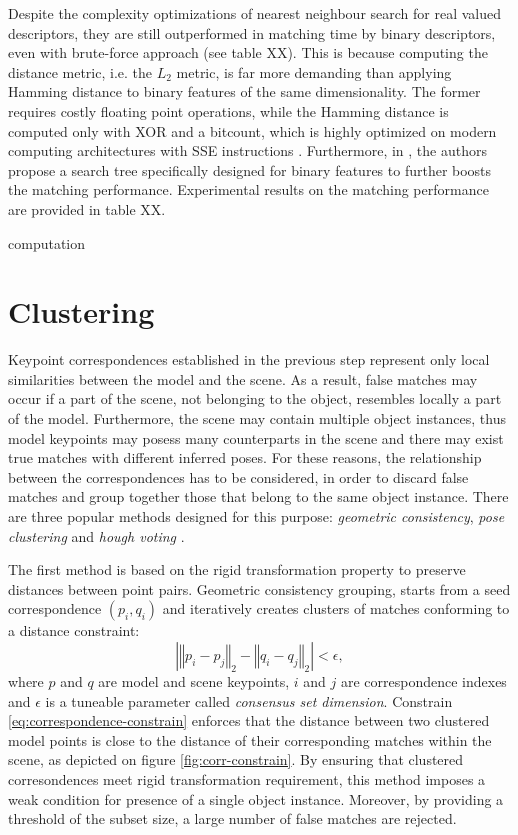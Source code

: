 Despite the complexity optimizations of nearest neighbour search for real valued descriptors, they are still outperformed in matching time by binary descriptors, even with brute-force approach (see table XX). This is because computing the distance metric, i.e. the $L_2$ metric, is far more demanding than applying Hamming distance to binary features of the same dimensionality. The former requires costly floating point operations, while the Hamming distance is computed only with XOR and a bitcount, which is highly optimized on modern computing architectures with SSE instructions \cite{ORB}. Furthermore, in \cite{binaryFlann}, the authors propose a search tree specifically designed for binary features to further boosts the matching performance. Experimental results on the matching performance are provided in table XX.

computation


\section{Clustering}
\label{sec:clustering}

Keypoint correspondences established in the previous step represent only local similarities between the model and the scene. As a result, false matches may occur if a part of the scene, not belonging to the object, resembles locally a part of the model. Furthermore, the scene may contain multiple object instances, thus model keypoints may posess many counterparts in the scene and there may exist true matches with different inferred poses. For these reasons, the relationship between the correspondences has to be considered, in order to discard false matches and group together those that belong to the same object instance. There are three popular methods designed for this purpose: \textit{geometric consistency}, \textit{pose clustering} and \textit{hough voting} \cite{hough}.

The first method is based on the rigid transformation property to preserve distances between point pairs. Geometric consistency \cite{geometricConsistency,multiPipeline} grouping, starts from a seed correspondence $(p_i, q_i)$ and iteratively creates clusters of matches conforming to a distance constraint:
\begin{equation}
\left|\left\Vert p_i - p_j \right\Vert_2 - \left\Vert q_i - q_j \right\Vert_2\right| < \epsilon,
\label{eq:correspondence-constrain}
\end{equation}
where $p$ and $q$ are model and scene keypoints, $i$ and $j$ are correspondence indexes and $\epsilon$ is a tuneable parameter called \textit{consensus set dimension}. Constrain \ref{eq:correspondence-constrain} enforces that the distance between two clustered model points is close to the distance of their corresponding matches within the scene, as depicted on figure \ref{fig:corr-constrain}. By ensuring that clustered corresondences meet rigid transformation requirement, this method imposes a weak condition for presence of a single object instance. Moreover, by providing a threshold of the subset size, a large number of false matches are rejected.


